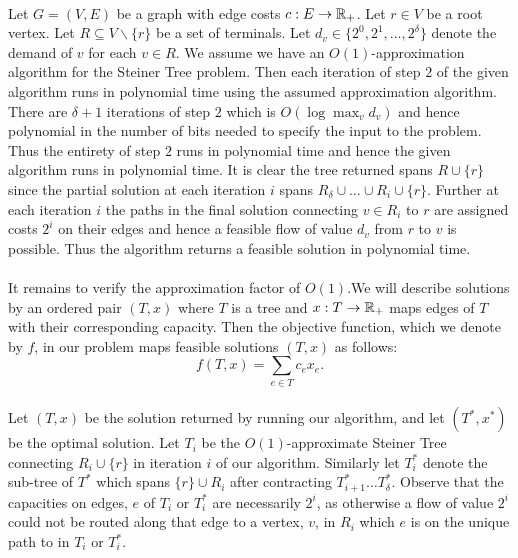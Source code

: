 \documentclass[letterpaper,12pt,oneside,onecolumn]{article}
\begin{document}
\paragraph{}
Let $G = (V,E)$ be a graph with edge costs $c: E \rightarrow \mathbb{R}_+$. Let $r \in V$ be a root vertex. Let $R \subseteq V \backslash \{r\}$ be a set of terminals. Let $d_v \in \{2^0, 2^1, \dots, 2^\delta\}$ denote the demand of $v$ for each $v \in R$. We assume we have an $O(1)$-approximation algorithm for the Steiner Tree problem. Then each iteration of step $2$ of the given algorithm runs in polynomial time using the assumed approximation algorithm. There are $\delta+1$ iterations of step $2$ which is $O(\log \max_v d_v)$ and hence polynomial in the number of bits needed to specify the input to the problem. Thus the entirety of step $2$ runs in polynomial time and hence the given algorithm runs in polynomial time. It is clear the tree returned spans $R \cup \{r\}$ since the partial solution at each iteration $i$ spans $R_\delta \cup \dots \cup R_i \cup \{r\}$. Further at each iteration $i$ the paths in the final solution connecting $v \in R_i$ to $r$ are assigned costs $2^i$ on their edges and hence a feasible flow of value $d_v$ from $r$ to $v$ is possible. Thus the algorithm returns a feasible solution in polynomial time.
\paragraph{}
It remains to verify the approximation factor of $O(1)$.We will describe solutions by an ordered pair $(T, x)$ where $T$ is a tree and $x : T \rightarrow \mathbb{R}_+$ maps edges of $T$ with their corresponding capacity. Then the objective function, which we denote by $f$, in our problem maps feasible solutions $(T,x)$ as follows:
$$f(T,x) = \sum_{e \in T} c_e x_e.$$
\paragraph{}
Let $(T,x)$ be the solution returned by running our algorithm, and let $(T^*, x^*)$ be the optimal solution. Let $T_{i}$ be the $O(1)$-approximate Steiner Tree connecting $R_i \cup \{r\}$ in iteration $i$ of our algorithm. Similarly let $T^*_i$ denote the sub-tree of $T^*$ which spans $\{r\} \cup R_i$ after contracting $T^*_{i+1} \dots T^*_\delta$. Observe that the capacities on edges, $e$ of $T_i$ or $T^*_i$ are necessarily $2^i$, as otherwise a flow of value $2^i$ could not be routed along that edge to a vertex, $v$, in $R_i$ which $e$ is on the unique path to in $T_i$ or $T^*_i$.
\end{document}
